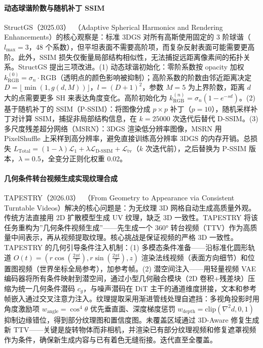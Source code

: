 \paragraph{动态球谐阶数与随机补丁 SSIM}

StructGS（2025.03）~\cite{2503_06462}（Adaptive Spherical Harmonics and Rendering Enhancements）的核心观察是：标准 3DGS 对所有高斯使用固定的 3 阶球谐（$l_{\max}=3$，48 个系数），但平坦表面不需要高阶项，而复杂反射表面可能需要更高阶。此外，SSIM 损失仅衡量局部结构相似性，无法捕捉远距离像素间的拓扑关系。StructGS 提出三项改进。(1) 动态球谐初始化：零阶系数按 opacity 加权 $k_{\text{RGB}}^{(0)} = \sigma_n \cdot \text{RGB}$（透明点的颜色影响被抑制）；高阶系数的阶数由邻近距离决定 $D = \lfloor\min(1, g(d, M))\rfloor$，$l = (D+1)^2$，参数 $M=5$ 为上界阶数，距离 $d$ 大的点需要更多 SH 来表达角度变化。高阶初始化为 $k_{\text{RGB}}^{(n)} = \sigma_n (1 - e^{-sd})$。(2) 基于随机补丁的 SSIM（P-SSIM）：将图像分成 $p \times p$ 补丁（$p=10$），随机采样补丁对计算 SSIM，捕捉非局部结构信息，在 $k=25000$ 次迭代后替代 D-SSIM。(3) 多尺度残差超分网络（MSRN）：3DGS 渲染低分辨率图像，MSRN 用 PixelShuffle 上采样到高分辨率，避免直接训练高分辨率 3DGS 的内存开销。总损失 $L_{\text{Total}} = (1-\lambda)\mathcal{L}_1 + \lambda \mathcal{L}_{\text{D-SSIM}} + \mathcal{L}_{\text{tv}}$（$k$ 次迭代前），之后替换为 P-SSIM 版本，$\lambda=0.5$，全变分正则化权重 0.02。

\paragraph{几何条件转台视频生成实现纹理合成}

TAPESTRY（2026.03）~\cite{2603_17735}（From Geometry to Appearance via Consistent Turntable Videos）解决的核心问题是：为无纹理 3D 网格自动生成高质量外观。传统方法直接用 2D 扩散模型生成 UV 纹理，缺乏 3D 一致性。TAPESTRY 将该任务重构为”几何条件视频生成”——先生成一个 360° 转台视频（TTV）作为高质量中间表示，再从视频提取纹理。核心挑战是保证视频的严格 3D 一致性。TAPESTRY 的几何引导条件注入机制：(1) 多模态条件准备——沿标准化圆形轨道 $O(t) = (r\cos(\frac{2\pi t}{T}), r\sin(\frac{2\pi t}{T}), z)$ 渲染法线视频（表面方向细节）和位置图视频（世界坐标全局参考），加参考帧。(2) 潜空间注入——用轻量视频 VAE 编码器将所有条件映射到潜空间，通过小型几何融合模块（2D 卷积+残差块）压缩为统一几何条件潜码 $c_g$，与噪声潜码在 DiT 主干的通道维度拼接，文本和参考帧嵌入通过交叉注意力注入。纹理提取采用渐进管线处理自遮挡：多视角投影时用角度激励项 $w_{\text{angle}} = \cos^4\theta$ 优先垂直面、深度梯度惩罚 $w_{\text{depth}} = \text{clip}(\nabla^2 d, 0, 1)$ 抑制边缘错位，得到部分纹理图和置信度图。未覆盖区域通过 3D-Aware 修复生成新 TTV——关键是旋转物体而非相机，并渲染已有部分纹理视频和修复遮罩视频作为条件，确保新生成内容与已有着色无缝衔接。迭代直至全覆盖。

